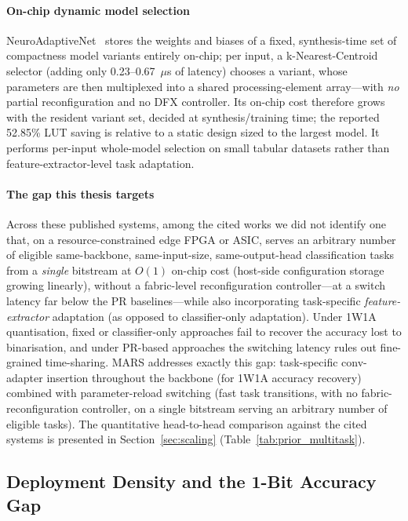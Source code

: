 \documentclass[12pt, a4paper]{report}
\numberwithin{equation}{chapter}
\numberwithin{figure}{chapter}
\numberwithin{table}{chapter}
\numberwithin{algorithm}{chapter}
\begin{document}
\paragraph{On-chip dynamic model selection} NeuroAdaptiveNet~\cite{ElBouazzaoui2025NeuroAdaptive} stores the weights and biases of a fixed, synthesis-time set of compactness model variants entirely on-chip; per input, a k-Nearest-Centroid selector (adding only 0.23--0.67~$\mu$s of latency) chooses a variant, whose parameters are then multiplexed into a shared processing-element array---with \emph{no} partial reconfiguration and no DFX controller. Its on-chip cost therefore grows with the resident variant set, decided at synthesis/training time; the reported 52.85\% LUT saving is relative to a static design sized to the largest model. It performs per-input whole-model selection on small tabular datasets rather than feature-extractor-level task adaptation.

\paragraph{The gap this thesis targets} Across these published systems, among the cited works we did not identify one that, on a resource-constrained edge FPGA or ASIC, serves an arbitrary number of eligible same-backbone, same-input-size, same-output-head classification tasks from a \emph{single} bitstream at $O(1)$ on-chip cost (host-side configuration storage growing linearly), without a fabric-level reconfiguration controller---at a switch latency far below the PR baselines---while also incorporating task-specific \emph{feature-extractor} adaptation (as opposed to classifier-only adaptation). Under 1W1A quantisation, fixed or classifier-only approaches fail to recover the accuracy lost to binarisation, and under PR-based approaches the switching latency rules out fine-grained time-sharing. MARS addresses exactly this gap: task-specific conv-adapter insertion throughout the backbone (for 1W1A accuracy recovery) combined with parameter-reload switching (fast task transitions, with no fabric-reconfiguration controller, on a single bitstream serving an arbitrary number of eligible tasks). The quantitative head-to-head comparison against the cited systems is presented in Section~\ref{sec:scaling} (Table~\ref{tab:prior_multitask}).

\subsection{Deployment Density and the 1-Bit Accuracy Gap}
\end{document}

